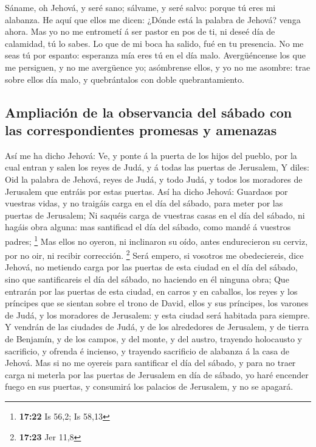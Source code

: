  Sáname, oh Jehová, y seré sano; sálvame, y seré salvo:
porque tú eres mi alabanza.  He aquí que ellos me dicen:
¿Dónde está la palabra de Jehová? venga ahora.  Mas yo no
me entrometí á ser pastor en pos de ti, ni deseé día de calamidad, tú lo
sabes. Lo que de mi boca ha salido, fué en tu presencia. 
No me seas tú por espanto: esperanza mía eres tú en el día malo.
 Avergüéncense los que me persiguen, y no me avergüence
yo; asómbrense ellos, y yo no me asombre: trae sobre ellos día malo, y
quebrántalos con doble quebrantamiento.

\hypertarget{ampliaciuxf3n-de-la-observancia-del-suxe1bado-con-las-correspondientes-promesas-y-amenazas}{%
\subsection{Ampliación de la observancia del sábado con las
correspondientes promesas y
amenazas}\label{ampliaciuxf3n-de-la-observancia-del-suxe1bado-con-las-correspondientes-promesas-y-amenazas}}

 Así me ha dicho Jehová: Ve, y ponte á la puerta de los
hijos del pueblo, por la cual entran y salen los reyes de Judá, y á
todas las puertas de Jerusalem,  Y diles: Oid la palabra
de Jehová, reyes de Judá, y todo Judá, y todos los moradores de
Jerusalem que entráis por estas puertas.  Así ha dicho
Jehová: Guardaos por vuestras vidas, y no traigáis carga en el día del
sábado, para meter por las puertas de Jerusalem;  Ni
saquéis carga de vuestras casas en el día del sábado, ni hagáis obra
alguna: mas santificad el día del sábado, como mandé á vuestros padres;
\footnote{\textbf{17:22} Is 56,2; Is 58,13}  Mas ellos no
oyeron, ni inclinaron su oído, antes endurecieron su cerviz, por no oir,
ni recibir corrección. \footnote{\textbf{17:23} Jer 11,8}
 Será empero, si vosotros me obedeciereis, dice Jehová,
no metiendo carga por las puertas de esta ciudad en el día del sábado,
sino que santificareis el día del sábado, no haciendo en él ninguna
obra;  Que entrarán por las puertas de esta ciudad, en
carros y en caballos, los reyes y los príncipes que se sientan sobre el
trono de David, ellos y sus príncipes, los varones de Judá, y los
moradores de Jerusalem: y esta ciudad será habitada para siempre.
 Y vendrán de las ciudades de Judá, y de los alrededores
de Jerusalem, y de tierra de Benjamín, y de los campos, y del monte, y
del austro, trayendo holocausto y sacrificio, y ofrenda é incienso, y
trayendo sacrificio de alabanza á la casa de Jehová.  Mas
si no me oyereis para santificar el día del sábado, y para no traer
carga ni meterla por las puertas de Jerusalem en día de sábado, yo haré
encender fuego en sus puertas, y consumirá los palacios de Jerusalem, y
no se apagará.

